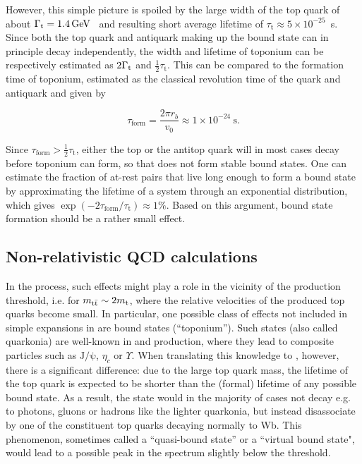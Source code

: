 However, this simple picture is spoiled by the large width of the top quark of about $\Gammat = \SI{1.4}{\GeV}$~\cite{PDG:2022pth} and resulting short average lifetime of $\tau_\mathrm{t} \approx 5 \times 10^{-25}$~s. Since both the top quark and antiquark making up the bound state can in principle decay independently, the width and lifetime of toponium can be respectively estimated as $2 \Gamma_{\mathrm{t}}$ and $\frac{1}{2} \tau_\mathrm{t}$. This can be compared to the formation time of toponium, estimated as the classical revolution time of the quark and antiquark and given by

\begin{equation}
  \tau_{\mathrm{form}} = \frac{2 \pi r_b}{v_0} \approx 1 \times 10^{-24}~\si{\second} .
\end{equation}

Since $\tau_{\mathrm{form}} > \frac{1}{2} \tau_\mathrm{t}$, either the top or the antitop quark will in most cases decay before toponium can form, so that \ttbar does not form stable bound states. One can estimate the fraction of at-rest \ttbar pairs that live long enough to form a bound state by approximating the lifetime of a \ttbar system through an exponential distribution, which gives $\exp(-2 \tau_{\mathrm{form}} / \tau_\mathrm{t}) \approx 1\%$. Based on this argument, \ttbar bound state formation should be a rather small effect.

\subsection{Non-relativistic QCD calculations}

In the \pptt process, such effects might play a role in the vicinity of the \ttbar production threshold, i.e. for $m_{\mathrm{t \bar{t}}} \sim 2 m_{\mathrm{t}}$, where the relative velocities of the produced top quarks become small. In particular, one possible class of effects not included in simple expansions in \alphas are \ttbar bound states (``toponium''). Such states (also called quarkonia) are well-known in \ccbar and \bbbar production, where they lead to composite particles such as $\mathrm{J/\psi}$, $\eta_c$ or $\Upsilon$. When translating this knowledge to \ttbar, however, there is a significant difference: due to the large top quark mass, the lifetime of the top quark is expected to be shorter than the (formal) lifetime of any possible \ttbar bound state. As a result, the state would in the majority of cases not decay e.g. to photons, gluons or hadrons like the lighter quarkonia, but instead disassociate by one of the constituent top quarks decaying normally to Wb. This phenomenon, sometimes called a ``quasi-bound state'' or a ``virtual bound state", would lead to a possible peak in the \mWWbb spectrum slightly below the \ttbar threshold.



